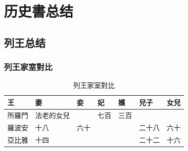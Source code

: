 \chapter{历史書总结}
\section{列王总结}
\subsection{列王家室對比}
\begin{table}[H]
\centering
\begin{tabular}{p{1.5cm}|p{3cm}|p{1.5cm}|p{1.5cm}|p{1.5cm}|p{1.5cm}|p{1.5cm}}\hline\hline
 王& 妻&妾&妃 &嬪 &兒子& 女兒\\\hline\hline
 所羅門&法老的女兒& &七百 &三百& & \\\hline
羅波安&十八&六十& &&二十八&六十\\\hline
 亞比雅&十四& && &二十二&十六\\\hline
\end{tabular} 
\caption{列王家室對比}
\end{table}

